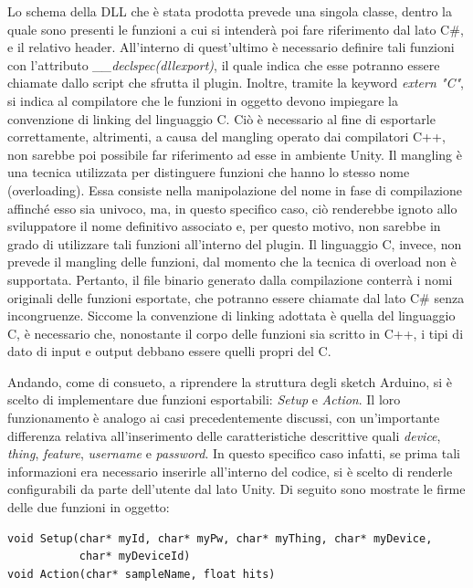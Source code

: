 Lo schema della DLL che è stata prodotta prevede una singola classe, dentro la quale sono presenti le funzioni a cui si intenderà poi fare riferimento dal lato C\#, e il relativo header. All'interno di quest'ultimo è necessario definire tali funzioni con l’attributo \textit{\_\_declspec(dllexport)}, il quale indica che esse potranno essere chiamate dallo script che sfrutta il plugin. Inoltre, tramite la keyword \textit{extern "C"}, si indica al compilatore che le funzioni in oggetto devono impiegare la convenzione di linking del linguaggio C. Ciò è necessario al fine di esportarle correttamente, altrimenti, a causa del mangling operato dai compilatori C++, non sarebbe poi possibile far riferimento ad esse in ambiente Unity. Il mangling è una tecnica utilizzata per distinguere funzioni che hanno lo stesso nome (overloading). Essa consiste nella manipolazione del nome in fase di compilazione affinché esso sia univoco, ma, in questo specifico caso, ciò renderebbe ignoto allo sviluppatore il nome definitivo associato e, per questo motivo, non sarebbe in grado di utilizzare tali funzioni all'interno del plugin. Il linguaggio C, invece, non prevede il mangling delle funzioni, dal momento che la tecnica di overload non è supportata. Pertanto, il file binario generato dalla compilazione conterrà i nomi originali delle funzioni esportate, che potranno essere chiamate dal lato C\# senza incongruenze. Siccome la convenzione di linking adottata è quella del linguaggio C, è necessario che, nonostante il corpo delle funzioni sia scritto in C++, i tipi di dato di input e output debbano essere quelli propri del C.

Andando, come di consueto, a riprendere la struttura degli sketch Arduino, si è scelto di implementare due funzioni esportabili: \textit{Setup} e \textit{Action}. Il loro funzionamento è analogo ai casi precedentemente discussi, con un’importante differenza relativa all’inserimento delle caratteristiche descrittive quali \textit{device}, \textit{thing}, \textit{feature}, \textit{username} e \textit{password}. In questo specifico caso infatti, se prima tali informazioni era necessario inserirle all'interno del codice, si è scelto di renderle configurabili da parte dell'utente dal lato Unity. Di seguito sono mostrate le firme delle due funzioni in oggetto:

\begin{verbatim}
void Setup(char* myId, char* myPw, char* myThing, char* myDevice,
           char* myDeviceId)
void Action(char* sampleName, float hits)
\end{verbatim}

